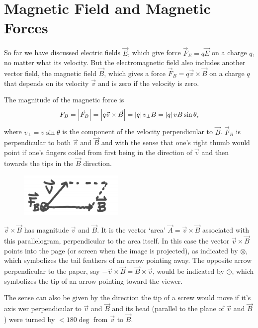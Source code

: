 \chapter{Magnetic Field and Magnetic Forces}
So far we have discussed electric fields $\vec{E}$, which give force $\vec{F}_E = q \vec{E}$ on a charge $q$, no matter what its velocity. But the electromagnetic field also includes another vector field, the magnetic field $\vec{B}$, which gives a force $\vec{F}_B = q\vec{v} \times \vec{B}$ on a charge $q$ that depends on its velocity $\vec{v}$ and is zero if the velocity is zero. 

The magnitude of the magnetic force is 
\begin{equation}
F_B = \left| \vec{F}_B \right| = \left| q\vec{v}\times \vec{B} \right| = \left| q \right|v_\perp B = \left| q \right|vB \sin \theta,
\end{equation}
where $v_\perp = v \sin \theta$ is the component of the velocity perpendicular to $\vec{B}$. $\vec{F}_B$ is perpendicular to both $\vec{v}$ and $\vec{B}$ and with the sense that one's right thumb would point if one's fingers coiled from first being in the direction of $\vec{v}$ and then towards the tips in the $\vec{B}$ direction. 

\begin{figure}
\centering
\includegraphics[width=5cm]{Images/chap7_1.png}
\end{figure}

$\vec{v} \times \vec{B}$ has magnitude $\vec{v}$ and $\vec{B}$. It is the vector `area' $\vec{A} = \vec{v} \times \vec{B}$ associated with this parallelogram, perpendicular to the area itself. In this case the vector $\vec{v} \times \vec{B}$ points into the page (or screen when the image is projected), as indicated by $\otimes$, which symbolizes the tail feathers of an arrow pointing away. The opposite arrow perpendicular to the paper, say $-\vec{v} \times \vec{B} = \vec{B} \times \vec{v}$, would be indicated by $\odot$, which symbolizes the tip of an arrow pointing toward the viewer.

The sense can also be given by the direction the tip of a screw would move if it's axis wer perpendicular to $\vec{v}$ and $\vec{B}$ and its head (parallel to the plane of $\vec{v}$ and $\vec{B}$) were turned by $<180\deg$ from $\vec{v}$ to $\vec{B}$.

